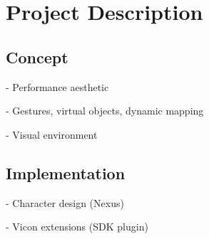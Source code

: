 \documentclass{nime-alternate}
\begin{document}
\section{Project Description}

\subsection{Concept}

- Performance aesthetic

- Gestures, virtual objects, dynamic mapping

- Visual environment

\subsection{Implementation}
- Character design (Nexus)

- Vicon extensions (SDK plugin)
\end{document}
